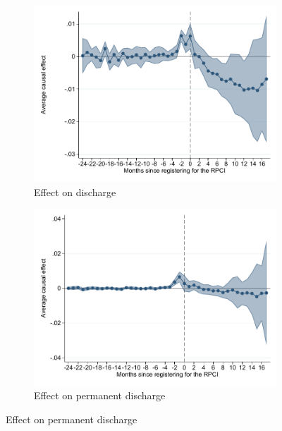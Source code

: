 \documentclass[oneside,11pt]{article}
\begin{document}
\begin{figure}[H]
\begin{center}
    \begin{subfigure}{0.49\textwidth}
    \caption{Effect on discharge}
    \includegraphics[width=\textwidth]{04_Figures/muestra_10porciento/event_study_baja_cierre_chaisemartin.pdf}
    \end{subfigure}
    \begin{subfigure}{0.49\textwidth}
    \caption{Effect on permanent discharge}
    \includegraphics[width=\textwidth]{04_Figures/muestra_10porciento/event_study_baja_permanente_chaisemartin.pdf}
    \end{subfigure}
    

\end{center}
\end{figure}
\end{document}
